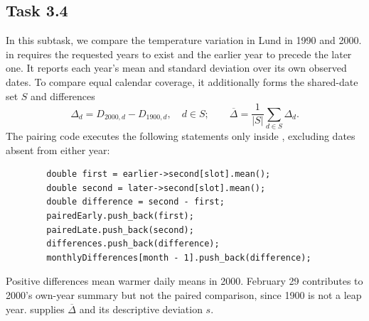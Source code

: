 \subsection{Task 3.4}
In this subtask, we compare the temperature variation in Lund in 1990 and 2000.  in  requires the requested years to exist and the earlier year to precede the later one. It reports each year's mean and standard deviation over its own observed dates. To compare equal calendar coverage, it additionally
forms the shared-date set $S$ and differences
\[
 \Delta_d=D_{2000,d}-D_{1900,d},\quad d\in S;\qquad
 \overline\Delta=\frac{1}{|S|}\sum_{d\in S}\Delta_d.
\]
The pairing code executes the following statements only inside
, excluding dates absent from either year:
\begin{lstlisting}
        double first = earlier->second[slot].mean();
        double second = later->second[slot].mean();
        double difference = second - first;
        pairedEarly.push_back(first);
        pairedLate.push_back(second);
        differences.push_back(difference);
        monthlyDifferences[month - 1].push_back(difference);
\end{lstlisting}
Positive differences mean warmer daily means in 2000. February 29 contributes to 2000's own-year summary but not the paired comparison, since 1900 is not a leap year.  supplies $\overline\Delta$ and its descriptive deviation $s$.